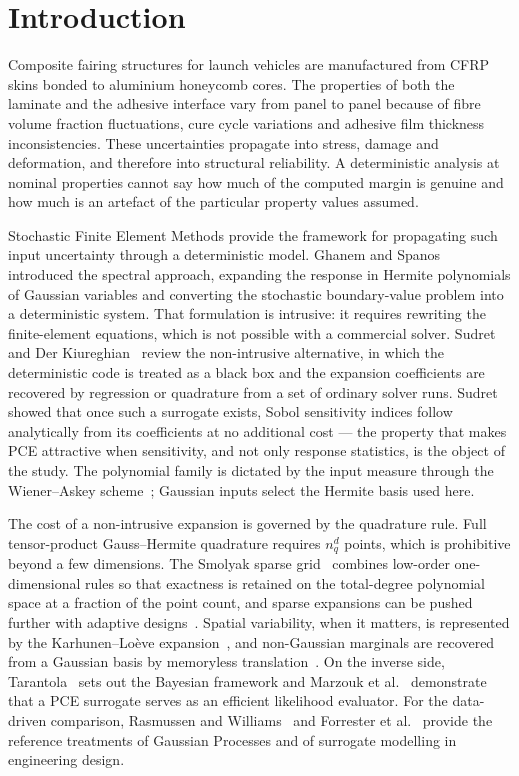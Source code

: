 \documentclass[review,3p,times,12pt,nopreprintline]{elsarticle}
\begin{document}
\section{Introduction}
\label{sec:intro}

Composite fairing structures for launch vehicles are manufactured from CFRP skins bonded to
aluminium honeycomb cores. The properties of both the laminate and the adhesive interface
vary from panel to panel because of fibre volume fraction fluctuations, cure cycle
variations and adhesive film thickness inconsistencies. These uncertainties propagate into
stress, damage and deformation, and therefore into structural reliability. A deterministic
analysis at nominal properties cannot say how much of the computed margin is genuine and
how much is an artefact of the particular property values assumed.

Stochastic Finite Element Methods provide the framework for propagating such input
uncertainty through a deterministic model. Ghanem and Spanos~\cite{ghanem1991} introduced
the spectral approach, expanding the response in Hermite polynomials of Gaussian variables
and converting the stochastic boundary-value problem into a deterministic system. That
formulation is intrusive: it requires rewriting the finite-element equations, which is not
possible with a commercial solver. Sudret and Der Kiureghian~\cite{sudret2000} review the
non-intrusive alternative, in which the deterministic code is treated as a black box and
the expansion coefficients are recovered by regression or quadrature from a set of ordinary
solver runs. Sudret~\cite{sudret2008} showed that once such a surrogate exists, Sobol
sensitivity indices follow analytically from its coefficients at no additional cost --- the
property that makes PCE attractive when sensitivity, and not only response statistics, is
the object of the study. The polynomial family is dictated by the input measure through the
Wiener--Askey scheme~\cite{xiu2002}; Gaussian inputs select the Hermite basis used here.

The cost of a non-intrusive expansion is governed by the quadrature rule. Full
tensor-product Gauss--Hermite quadrature requires $n_q^d$ points, which is prohibitive
beyond a few dimensions. The Smolyak sparse grid~\cite{smolyak1963} combines low-order
one-dimensional rules so that exactness is retained on the total-degree polynomial space at
a fraction of the point count, and sparse expansions can be pushed further with adaptive
designs~\cite{fajraoui2017}. Spatial variability, when it matters, is represented by the
Karhunen--Lo\`{e}ve expansion~\cite{loeve1978,phoon1999}, and non-Gaussian marginals are
recovered from a Gaussian basis by memoryless translation~\cite{grigoriu1998}. On the
inverse side, Tarantola~\cite{tarantola2005} sets out the Bayesian framework and Marzouk et
al.~\cite{marzouk2007} demonstrate that a PCE surrogate serves as an efficient likelihood
evaluator. For the data-driven comparison, Rasmussen and Williams~\cite{rasmussen2006} and
Forrester et al.~\cite{forrester2008} provide the reference treatments of Gaussian Processes
and of surrogate modelling in engineering design.
\end{document}
